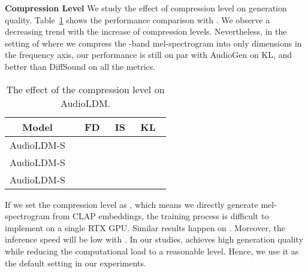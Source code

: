 \documentclass{article}
\begin{document}
\textbf{Compression Level} We study the effect of compression level  on generation quality. Table~\ref{tab: compressionratio} shows the performance comparison with . We observe a decreasing trend with the increase of compression levels. Nevertheless, in the setting of  where we compress the -band mel-spectrogram into only  dimensions in the frequency axis, our performance is still on par with AudioGen on KL, and better than DiffSound on all the metrics.

\begin{table}[htbp]
\centering
\small
\begin{tabular}{ccccc}
\toprule
Model         &  & FD~   & IS~   & KL~   \\
\midrule
AudioLDM-S &           &  &  &  \\
AudioLDM-S &           &   &  &  \\
AudioLDM-S &          &   &  &  \\
\bottomrule
\end{tabular}
\caption{The effect of the compression level on AudioLDM.}
\label{tab: compressionratio}
\end{table}

If we set the compression level as , which means we directly generate mel-spectrogram from CLAP embeddings, the training process is difficult to implement on a single RTX  GPU. Similar results happen on . Moreover, the inference speed will be low with . In our studies,  achieves high generation quality while reducing the computational load to a reasonable level. Hence, we use it as the default setting in our experiments.
\end{document}
